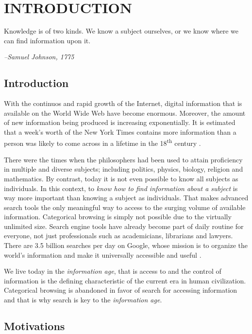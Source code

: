 


\chapter{\textbf{INTRODUCTION}}
\label{ch1}

\renewcommand{\epigraphsize}{\bfseries\footnotesize}
\setlength{\epigraphwidth}{.48\textwidth}

\epigraph{Knowledge is of two kinds. We know a subject ourselves, or we know where we can find information upon it.}{\textit{--Samuel Johnson, 1775}}

\section{Introduction}
With the continuos and rapid growth of the Internet, digital information that is available on the World Wide Web have become enormous.
Moreover, the amount of new information being produced is increasing exponentially.
It is estimated that a week's worth of the New York Times contains more information than a person was likely to come across in a lifetime in the 18\textsuperscript{th} century \citep{ia}.

There were the times when the philosophers had been used to attain proficiency in multiple and diverse subjects; including politics, physics, biology, religion and mathematics.
By contrast, today it is not even possible to know all subjects as individuals. 
In this context, to \emph{know how to find information about a subject} is way more important than knowing a subject as individuals.
That makes advanced search tools the only meaningful way to access to the surging volume of available information. 
Categorical browsing is simply not possible due to the virtually unlimited size. 
Search engine tools have already become part of daily routine for everyone, not just professionals such as academicians, librarians and lawyers.
There are 3.5 billion searches per day on Google, whose mission is to organize the world's information and make it universally accessible and useful \citep{google}.

We live today in the \emph{information age}, that is access to and the control of information is the defining characteristic of the current era in human civilization.
Categorical browsing is abandoned in favor of search for accessing information and that is why search is key to the \emph{information age}.

\section{Motivations}
\label{1.1}

